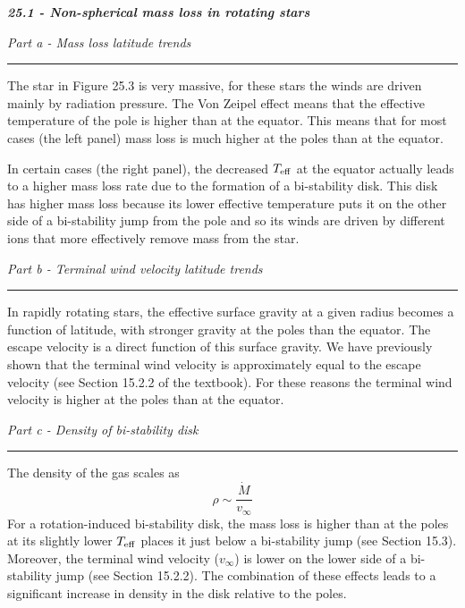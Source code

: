 \documentclass[12pt, letterpaper, twoside]{article}
\newcommand{\question}[1]{{\noindent \it #1}}
\newcommand{\answer}[1]{
    \par\noindent\rule{\textwidth}{0.4pt}#1\vspace{0.5cm}
}
\begin{document}
\question{\textbf{25.1 - Non-spherical mass loss in rotating stars}}

\question{Part a - Mass loss latitude trends}
\answer{
    The star in Figure 25.3 is very massive, for these stars the winds are driven mainly by radiation pressure. The Von Zeipel effect means that the effective temperature of the pole is higher than at the equator. This means that for most cases (the left panel) mass loss is much higher at the poles than at the equator.

    In certain cases (the right panel), the decreased $T_{\rm eff}$ at the equator actually leads to a higher mass loss rate due to the formation of a bi-stability disk. This disk has higher mass loss because its lower effective temperature puts it on the other side of a bi-stability jump from the pole and so its winds are driven by different ions that more effectively remove mass from the star.
}

\question{Part b - Terminal wind velocity latitude trends}
\answer{
    In rapidly rotating stars, the effective surface gravity at a given radius becomes a function of latitude, with stronger gravity at the poles than the equator. The escape velocity is a direct function of this surface gravity. We have previously shown that the terminal wind velocity is approximately equal to the escape velocity (see Section 15.2.2 of the textbook). For these reasons the terminal wind velocity is higher at the poles than at the equator.
}

\question{Part c - Density of bi-stability disk}
\answer{
    The density of the gas scales as
    \begin{equation}
        \rho \sim \frac{\dot{M}}{v_{\infty}}
    \end{equation}
    For a rotation-induced bi-stability disk, the mass loss is higher than at the poles at its slightly lower $T_{\rm eff}$ places it just below a bi-stability jump (see Section 15.3). Moreover, the terminal wind velocity ($v_\infty$) is lower on the lower side of a bi-stability jump (see Section 15.2.2). The combination of these effects leads to a significant increase in density in the disk relative to the poles.
}
\end{document}

